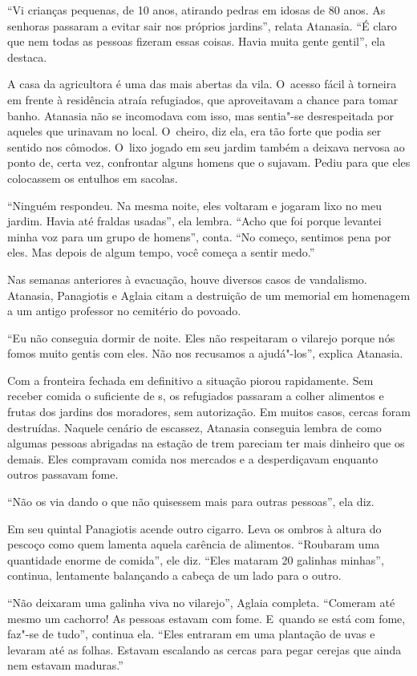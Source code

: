 ``Vi crianças pequenas, de 10 anos, atirando pedras em idosas de 80
anos. As senhoras passaram a evitar sair nos próprios jardins'', relata
Atanasia. ``É claro que nem todas as pessoas fizeram essas coisas. Havia
muita gente gentil'', ela destaca.

A casa da agricultora é uma das mais abertas da vila. O~acesso fácil à
torneira em frente à residência atraía refugiados, que aproveitavam a
chance para tomar banho. Atanasia não se incomodava com isso, mas
sentia"-se desrespeitada por aqueles que urinavam no local. O~cheiro, diz
ela, era tão forte que podia ser sentido nos cômodos. O~lixo jogado em
seu jardim também a deixava nervosa ao ponto de, certa vez, confrontar
alguns homens que o sujavam. Pediu para que eles colocassem os entulhos
em sacolas.

``Ninguém respondeu. Na mesma noite, eles voltaram e jogaram lixo no meu
jardim. Havia até fraldas usadas'', ela lembra. ``Acho que foi porque
levantei minha voz para um grupo de homens'', conta. ``No começo,
sentimos pena por eles. Mas depois de algum tempo, você começa a sentir
medo.''

Nas semanas anteriores à evacuação, houve diversos casos de vandalismo.
Atanasia, Panagiotis e Aglaia citam a destruição de um memorial em
homenagem a um antigo professor no cemitério do povoado.

``Eu não conseguia dormir de noite. Eles não respeitaram o vilarejo
porque nós fomos muito gentis com eles. Não nos recusamos a ajudá"-los'',
explica Atanasia.

Com a fronteira fechada em definitivo a situação piorou rapidamente.
Sem receber comida o suficiente de s, os refugiados passaram a colher
alimentos e frutas dos jardins dos moradores, sem autorização. Em muitos
casos, cercas foram destruídas. Naquele cenário de escassez, Atanasia
conseguia lembra de como algumas pessoas abrigadas na estação de trem
pareciam ter mais dinheiro que os demais. Eles compravam comida nos
mercados e a desperdiçavam enquanto outros passavam fome.

``Não os via dando o que não quisessem mais para outras pessoas'', ela
diz.

Em seu quintal Panagiotis acende outro cigarro. Leva os ombros à altura
do pescoço como quem lamenta aquela carência de alimentos. ``Roubaram
uma quantidade enorme de comida'', ele diz. ``Eles mataram 20 galinhas
minhas'', continua, lentamente balançando a cabeça de um lado para o
outro.

``Não deixaram uma galinha viva no vilarejo'', Aglaia completa.
``Comeram até mesmo um cachorro! As pessoas estavam com fome. E~quando
se está com fome, faz"-se de tudo'', continua ela. ``Eles entraram em uma
plantação de uvas e levaram até as folhas. Estavam escalando as cercas
para pegar cerejas que ainda nem estavam maduras.''

